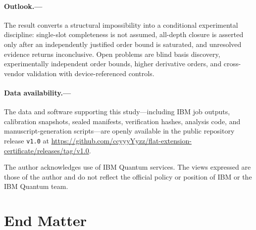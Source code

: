 \documentclass[aps,prl,reprint,superscriptaddress,nofootinbib]{revtex4-2}
\begin{document}
\paragraph{Outlook.---}
The result converts a structural impossibility into a conditional experimental discipline: single-slot completeness is not assumed, all-depth closure is asserted only after an independently justified order bound is saturated, and unresolved evidence returns inconclusive.  Open problems are blind basis discovery, experimentally independent order bounds, higher derivative orders, and cross-vendor validation with device-referenced controls.

\paragraph{Data availability.---}
The data and software supporting this study---including IBM job outputs, calibration snapshots, sealed manifests, verification hashes, analysis code, and manuscript-generation scripts---are openly available in the public repository release \texttt{v1.0} at \url{https://github.com/ccyyyYyzz/flat-extension-certificate/releases/tag/v1.0}.

\begin{acknowledgments}
The author acknowledges use of IBM Quantum services.  The views expressed are those of the author and do not reflect the official policy or position of IBM or the IBM Quantum team.
\end{acknowledgments}



\section*{End Matter}

\setcounter{equation}{0}
\renewcommand{\theequation}{A\arabic{equation}}
\end{document}
